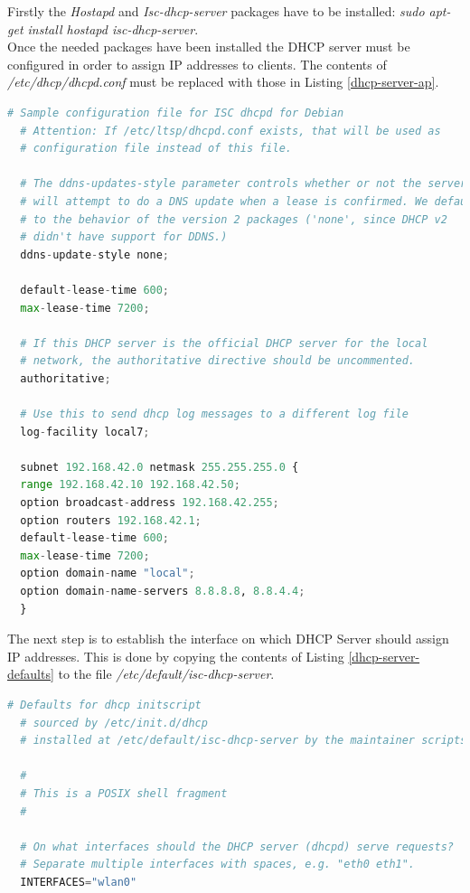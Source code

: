 Firstly the  \textit{Hostapd} \cite{component13} and  \textit{Isc-dhcp-server} \cite{component14} packages have to be installed: \textit{sudo apt-get install hostapd isc-dhcp-server}.\\

Once the needed packages have been installed the DHCP server must be configured in order to assign IP addresses to clients. The contents of \textit{/etc/dhcp/dhcpd.conf} must be replaced with those in Listing \ref{dhcp-server-ap}. \\

	\begin{minipage}{\linewidth}%
	\begin{lstlisting}[label=dhcp-server-ap,caption=DHCP Server Configuration {[} /etc/dhcp/dhcpd.conf {]} ,language=python ]
  # Sample configuration file for ISC dhcpd for Debian
  # Attention: If /etc/ltsp/dhcpd.conf exists, that will be used as
  # configuration file instead of this file.

  # The ddns-updates-style parameter controls whether or not the server
  # will attempt to do a DNS update when a lease is confirmed. We default 
  # to the behavior of the version 2 packages ('none', since DHCP v2 
  # didn't have support for DDNS.)
  ddns-update-style none;

  default-lease-time 600;
  max-lease-time 7200;

  # If this DHCP server is the official DHCP server for the local
  # network, the authoritative directive should be uncommented.
  authoritative;

  # Use this to send dhcp log messages to a different log file 
  log-facility local7;

  subnet 192.168.42.0 netmask 255.255.255.0 {
  range 192.168.42.10 192.168.42.50;
  option broadcast-address 192.168.42.255;
  option routers 192.168.42.1;
  default-lease-time 600;
  max-lease-time 7200;
  option domain-name "local";
  option domain-name-servers 8.8.8.8, 8.8.4.4;
  }
	\end{lstlisting}
	\end{minipage}

\bigskip
The next step is to establish the interface on which DHCP Server should assign IP addresses. This is done by copying the contents of Listing \ref{dhcp-server-defaults} to the file \textit{/etc/default/isc-dhcp-server}.\\

	\begin{minipage}{\linewidth}%
	\begin{lstlisting}[label=dhcp-server-defaults,caption=DHCP Server Defaults {[} /etc/default/isc-dhcp-server {]} ,language=python ]
  # Defaults for dhcp initscript
  # sourced by /etc/init.d/dhcp
  # installed at /etc/default/isc-dhcp-server by the maintainer scripts

  #
  # This is a POSIX shell fragment
  #

  # On what interfaces should the DHCP server (dhcpd) serve requests?
  # Separate multiple interfaces with spaces, e.g. "eth0 eth1".
  INTERFACES="wlan0"
	\end{lstlisting}
	\end{minipage}

